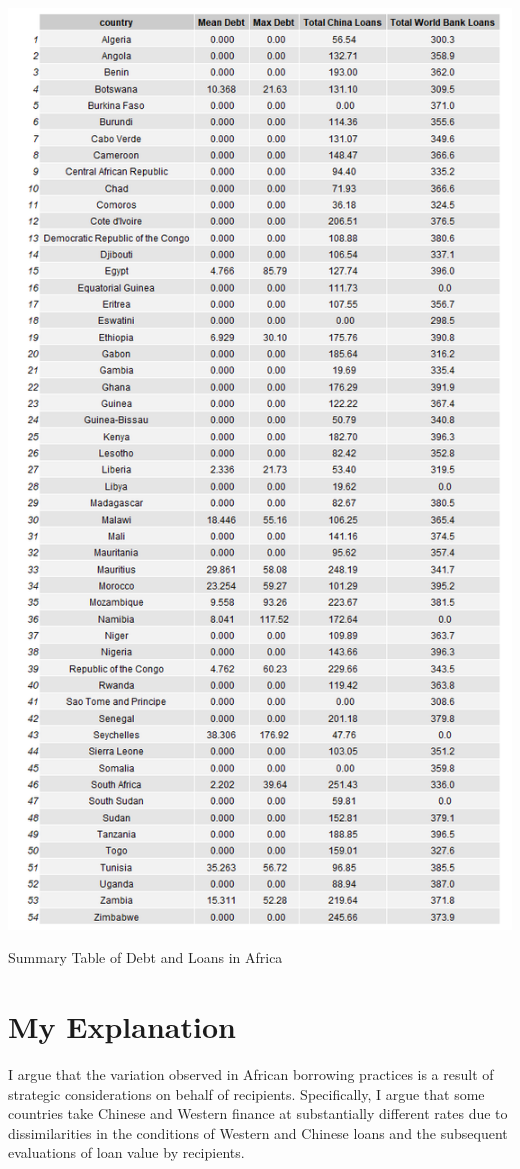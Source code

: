 \documentclass[12pt]{article}
\begin{document}
\begin{table}
    \centering
    \includegraphics[scale=0.53]{Figures/summary1.png}
    \caption{Summary Table of Debt and Loans in Africa}
\end{table}

\section*{My Explanation}
I argue that the variation observed in African borrowing practices is a result of strategic considerations on behalf of recipients. Specifically, I argue that some countries take Chinese and Western finance at substantially different rates due to dissimilarities in the conditions of Western and Chinese loans and the subsequent evaluations of loan value by recipients.
\end{document}
